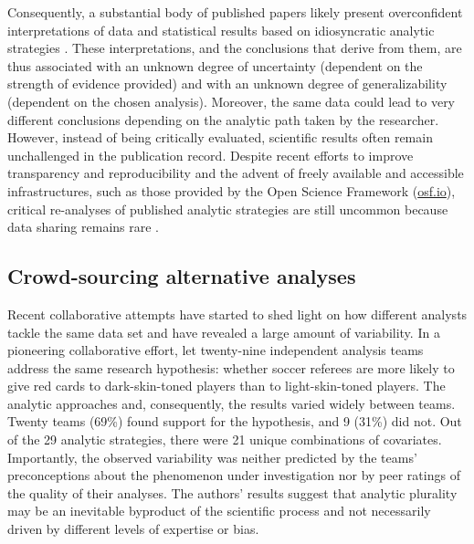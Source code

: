 \documentclass[Review,times,sageh]{sagej}
\begin{document}
Consequently, a substantial body of published papers likely present overconfident interpretations of data and statistical results based on idiosyncratic analytic strategies \citep[e.g.,][]{simmons2011false, gelman2014statistical}.
These interpretations, and the conclusions that derive from them, are thus associated with an unknown degree of uncertainty (dependent on the strength of evidence provided) and with an unknown degree of generalizability (dependent on the chosen analysis).
Moreover, the same data could lead to very different conclusions depending on the analytic path taken by the researcher.
However, instead of being critically evaluated, scientific results often remain unchallenged in the publication record.
Despite recent efforts to improve transparency and reproducibility \citep[e.g.][]{miguel2014promoting, klein2018practical} and the advent of freely available and accessible infrastructures, such as those provided by the Open Science Framework (\href{https://osf.io}{osf.io}), critical re-analyses of published analytic strategies are still uncommon because data sharing remains rare \citep{wicherts2006poor}.

\hypertarget{crowd-sourcing-alternative-analyses}{%
\subsection{Crowd-sourcing alternative analyses}\label{crowd-sourcing-alternative-analyses}}

Recent collaborative attempts have started to shed light on how different analysts tackle the same data set and have revealed a large amount of variability.
In a pioneering collaborative effort, \citet{silberzahn2018many} let twenty-nine independent analysis teams address the same research hypothesis: whether soccer referees are more likely to give red cards to dark-skin-toned players than to light-skin-toned players.
The analytic approaches and, consequently, the results varied widely between teams.
Twenty teams (69\%) found support for the hypothesis, and 9 (31\%) did not.
Out of the 29 analytic strategies, there were 21 unique combinations of covariates.
Importantly, the observed variability was neither predicted by the teams' preconceptions about the phenomenon under investigation nor by peer ratings of the quality of their analyses.
The authors' results suggest that analytic plurality may be an inevitable byproduct of the scientific process and not necessarily driven by different levels of expertise or bias.
\end{document}
